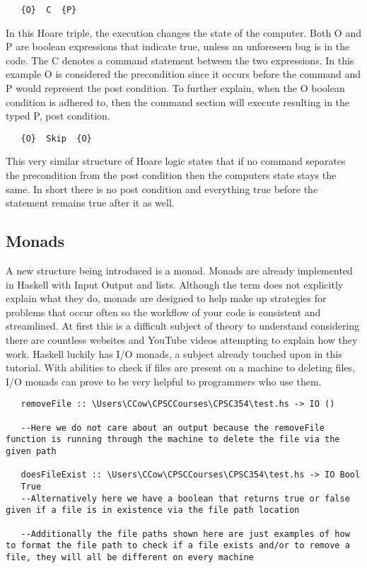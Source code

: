\documentclass{article}
\begin{document}
\begin{lstlisting}
   {O}  C  {P}
\end{lstlisting}

\noindent In this Hoare triple, the execution changes the state of the computer. Both O and P are boolean expressions that indicate true, unless an unforeseen bug is in the code. The C denotes a command statement between the two expressions. In this example O is considered the precondition since it occurs before the command and P would represent the post condition. To further explain, when the O boolean condition is adhered to, then the command section will execute resulting in the typed P, post condition. 

\medskip
\caption{Empty Command Logic}
\begin{lstlisting}
   {O}  Skip  {O}
\end{lstlisting}

This very similar structure of Hoare logic states that if no command separates the precondition from the post condition then the computers state stays the same. In short there is no post condition and everything true before the statement remains true after it as well.

\subsection{Monads}
A new structure being introduced is a monad. Monads are already implemented in Haskell with Input Output and lists. Although the term does not explicitly explain what they do, monads are designed to help make up strategies for problems that occur often so the workflow of your code is consistent and streamlined. At first this is a difficult subject of theory to understand considering there are countless websites and YouTube videos attempting to explain how they work. Haskell luckily has I/O monads, a subject already touched upon in this tutorial. With abilities to check if files are present on a machine to deleting files, I/O monads can prove to be very helpful to programmers who use them.

\medskip
\caption{Default I/O Monad within Haskell}
\begin{lstlisting}
   removeFile :: \Users\CCow\CPSCCourses\CPSC354\test.hs -> IO ()
   
   --Here we do not care about an output because the removeFile function is running through the machine to delete the file via the given path
   
   doesFileExist :: \Users\CCow\CPSCCourses\CPSC354\test.hs -> IO Bool
   True
   --Alternatively here we have a boolean that returns true or false given if a file is in existence via the file path location
   
   --Additionally the file paths shown here are just examples of how to format the file path to check if a file exists and/or to remove a file, they will all be different on every machine
\end{lstlisting}
\end{document}
